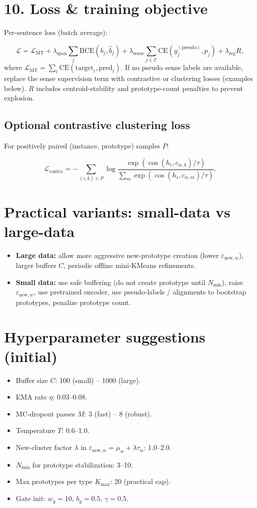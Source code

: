 \documentclass[a4paper,12pt]{article}
\begin{document}
\section*{10. Loss \& training objective}
Per-sentence loss (batch average):

\[
\mathcal{L} = \mathcal{L}_{\text{MT}} + \lambda_{\text{span}} \sum_j \text{BCE}(b_j, \hat{b}_j) + \lambda_{\text{sense}} \sum_{j \in \mathcal{C}} \text{CE}(y_j^{(\text{pseudo})}, \hat{p}_j) + \lambda_{\text{reg}} R,
\]
where $\mathcal{L}_{\text{MT}} = \sum_t \text{CE}(\text{target}_t, \text{pred}_t)$. If no pseudo sense labels are available, replace the sense supervision term with contrastive or clustering losses (examples below). $R$ includes centroid-stability and prototype-count penalties to prevent explosion.

\subsection*{Optional contrastive clustering loss}
For positively paired (instance, prototype) samples $P$:

\[
\mathcal{L}_{\text{contra}} = - \sum_{(i,k) \in P} \log \frac{\exp(\cos(h_i, c_{w,k})/\tau)}{\sum_m \exp(\cos(h_i, c_{w,m})/\tau)}.
\]

\section*{Practical variants: small-data vs large-data}
\begin{itemize}
    \item \textbf{Large data:} allow more aggressive new-prototype creation (lower $\varepsilon_{\text{new},w}$), larger buffers $C$, periodic offline mini-KMeans refinements.
    \item \textbf{Small data:} use safe buffering (do not create prototype until $N_{\min}$), raise $\varepsilon_{\text{new},w}$, use pretrained encoder, use pseudo-labels / alignments to bootstrap prototypes, penalize prototype count.
\end{itemize}

\section*{Hyperparameter suggestions (initial)}
\begin{itemize}
    \item Buffer size $C$: 100 (small) -- 1000 (large).
    \item EMA rate $\eta$: 0.03--0.08.
    \item MC-dropout passes $M$: 3 (fast) -- 8 (robust).
    \item Temperature $T$: 0.6--1.0.
    \item New-cluster factor $\lambda$ in $\varepsilon_{\text{new},w} = \mu_w + \lambda \tau_w$: 1.0--2.0.
    \item $N_{\min}$ for prototype stabilization: 3--10.
    \item Max prototypes per type $K_{\max}$: 20 (practical cap).
    \item Gate init: $w_g = 10$, $b_g = 0.5$, $\gamma = 0.5$.
\end{itemize}
\end{document}

